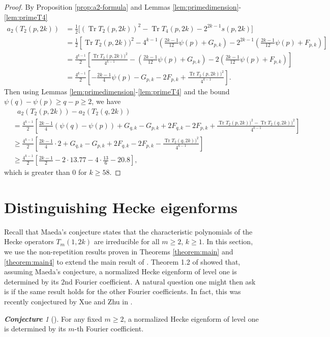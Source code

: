 \documentclass[11pt,letterpaper,reqno]{amsart}
\numberwithin{figure}{section}
\numberwithin{table}{section}
\theoremstyle{definition}
\theoremstyle{plain}
\newcommand{\lrp}[1]{\left(#1\right)}
\newcommand{\lrb}[1]{\left[#1\right]}
\theoremstyle{definition}
\theoremstyle{definition}
\theoremstyle{remark}
\newtheorem{conjecture}[theorem]{\bf Conjecture}
\numberwithin{equation}{section}
\DeclareMathOperator{\Tr}{Tr}
\begin{document}
\begin{proof}
    

 By Proposition \ref{prop:a2-formula} and Lemmas \ref{lem:primedimension}-\ref{lem:primeT4}
    \begin{align}
    a_{2}(T_2(p,2k))
    &=\frac{1}{2} \Big[(\Tr T_2(p, 2k))^2-\Tr T_4(p, 2k) - 2^{2k-1}s(p, 2k) \Big] \\
    &= \frac{1}{2} \lrb{ \Tr T_2(p, 2k))^2 - 
    4^{k-1} \lrp{ \frac{2k-1}{12}\psi(p) + G_{p,k}} -  2^{2k-1} \lrp{\frac{2k-1}{12} \psi(p) + F_{p,k} }  } \\
    &= \frac{4^{k-1}}{2} \lrb{ \frac{\Tr T_2(p, 2k))^2}{4^{k-1}} - 
    \lrp{ \frac{2k-1}{12}\psi(p) + G_{p,k}} -  2 \lrp{\frac{2k-1}{12} \psi(p) + F_{p,k} }  } \\
    &= \frac{4^{k-1}}{2} \lrb{ - 
     \frac{2k-1}{4}\psi(p) - G_{p,k} -  2  F_{p,k} +  \frac{\Tr T_2(p, 2k))^2}{4^{k-1}}   }. 
    \end{align}
    Then using Lemmas \ref{lem:primedimension}-\ref{lem:primeT4} and the bound $\psi(q)-\psi(p)\ge q-p\ge2$, we have
    \begin{align}
         & \ \ \ a_{2}(T_2(p,2k))-a_{2}(T_2(q,2k))\\
         &= \frac{4^{k-1}}{2} \lrb{
            \frac{2k-1}{4}\lrp{\psi(q)-\psi(p)} + G_{q,k}-G_{p,k} +  2 F_{q,k} - 2 F_{p,k} + \frac{\Tr T_2(p, 2k))^2 - \Tr T_2(q, 2k))^2}{4^{k-1}} 
        } \\
        &\geq \frac{4^{k-1}}{2} \lrb{
            \frac{2k-1}{4} \cdot 2 + G_{q,k}-G_{p,k} +  2 F_{q,k} - 2 F_{p,k} -\frac{ \Tr T_2(q, 2k))^2}{4^{k-1}} 
        } \\
        &\geq \frac{4^{k-1}}{2} \lrb{
            \frac{2k-1}{2} - 2\cdot 13.77 - 4 \cdot \frac{13}{6} - 20.8
        },
    \end{align}
    which is greater than $0$ for $k\ge 58$. 
\end{proof}



\section{Distinguishing Hecke eigenforms} \label{sect:distinguish}


Recall that Maeda's conjecture states that the characteristic polynomials of the Hecke operators $T_m(1,2k)$ are irreducible for all $m \ge 2$, $k \ge 1$.
In this section, we use the non-repetition results proven in Theorems \ref{theorem:main} and \ref{theorem:main4} to extend the main result of \cite{Vilardi2018}.
Theorem 1.2 of \cite{Vilardi2018} showed that, assuming Maeda's conjecture, a normalized Hecke eigenform of level one is determined by its $2$nd Fourier coefficient.
A natural question one might then ask is if the same result holds for the other Fourier coefficients. 
In fact, this was recently conjectured by Xue and Zhu in \cite{xue-zhu}.
\begin{conjecture}[{\cite[Conjecture 3.5]{xue-zhu}}] \label{conj:distinguish}
    For any fixed $m \geq 2$, a normalized Hecke eigenform of level one is determined by its $m$-th Fourier coefficient.
\end{conjecture}
\end{document}
